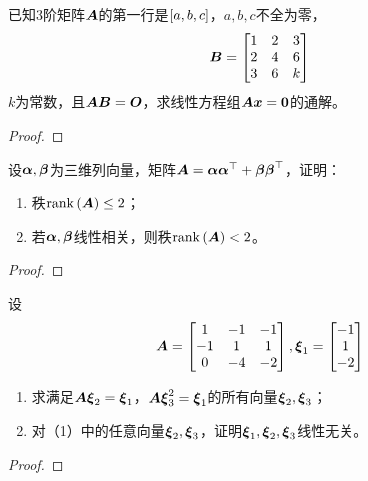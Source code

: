 \begin{problem}\label{problem-2.14}
已知\(3\)阶矩阵\(\boldsymbol{A}\)的第一行是\(\left[ a,b,c \right]\)，\(a,b,c\)不全为零，
\begin{equation*}
    \boldsymbol{B}=
    \begin{bmatrix}
        1 & 2 & 3 \\
        2 & 4 & 6 \\
        3 & 6 & k
    \end{bmatrix}
\end{equation*}
\(k\)为常数，且\(\boldsymbol{A}\boldsymbol{B}=\boldsymbol{O}\)，求线性方程组\(\boldsymbol{A}\boldsymbol{x}=\boldsymbol{0}\)的通解。
\end{problem}
\begin{proof}
\end{proof}

\begin{problem}\label{problem-2.15}
设\(\boldsymbol{\alpha},\boldsymbol{\beta}\)为三维列向量，矩阵\(\boldsymbol{A}=\boldsymbol{\alpha}\boldsymbol{\alpha}^\top+\boldsymbol{\beta}\boldsymbol{\beta}^\top\)，证明：
\begin{enumerate}
    \item 秩\(\mathrm{rank}\left( \boldsymbol{A} \right)\le2\)；
    \item 若\(\boldsymbol{\alpha},\boldsymbol{\beta}\)线性相关，则秩\(\mathrm{rank}\left( \boldsymbol{A} \right)<2\)。
\end{enumerate}
\end{problem}
\begin{proof}
\end{proof}

\begin{problem}\label{problem-2.16}
设
\begin{equation*}
    \boldsymbol{A}=
    \begin{bmatrix}
        1  & -1 & -1 \\
        -1 & 1  & 1  \\
        0  & -4 & -2
    \end{bmatrix},
    \boldsymbol{\xi}_1=\begin{bmatrix}-1\\1\\-2\end{bmatrix}
\end{equation*}
\begin{enumerate}
    \item 求满足\(\boldsymbol{A}\boldsymbol{\xi}_2=\boldsymbol{\xi}_1\)，\(\boldsymbol{A}\boldsymbol{\xi}_3^2=\boldsymbol{\xi}_1\)的所有向量\(\boldsymbol{\xi}_2,\boldsymbol{\xi}_3\)；
    \item 对（1）中的任意向量\(\boldsymbol{\xi}_2,\boldsymbol{\xi}_3\)，证明\(\boldsymbol{\xi}_1,\boldsymbol{\xi}_2,\boldsymbol{\xi}_3\)线性无关。
\end{enumerate}
\end{problem}
\begin{proof}
\end{proof}

